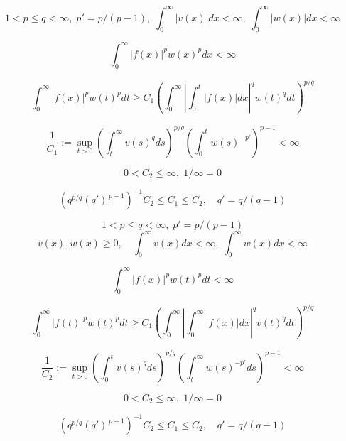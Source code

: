 $$
1<p\le q<\infty,\;p'=p/(p-1),\;\int^\infty_0|v(x)|dx<\infty,\;\int^\infty_0|w(x)|dx<\infty
$$

$$
\int^\infty_0|f(x)|^pw(x)^p dx<\infty
$$

$$
\int^\infty_0|f(x)|^p w(t)^p dt \ge C_1\left(\int^\infty_0\left|\int^t_0|f(x)|dx\right|^q w(t)^q dt\right)^{p/q}
$$

$$
\frac{1}{C_1}:=\sup_{t>0}\left(\int^\infty_t v(s)^q ds\right)^{p/q}\left(\int^t_0 w(s)^{-p'}\right)^{p-1}<\infty
$$

$$
0<C_2\le \infty,\; 1/\infty=0
$$

$$
\left(q^{p/q}(q')^{\,p-1}\right)^{-1}C_2 \le C_1 \le C_2,\quad q'=q/(q-1)
$$

$$
1<p \le q <\infty, \; p'=p/(p-1)
$$
$$
v(x),w(x) \ge 0, \quad \int^\infty_0 v(x) dx <\infty,\;\int^\infty_0 w(x) dx <\infty
$$

$$
\int^{\infty}_{0}|f(x)|^{p}w(t)^{p}dt<\infty
$$

$$
\int^{\infty}_{0}|f(t)|^{p}w(t)^{p}dt \ge C_{1}\left(\int^{\infty}_{0}\left|\int^{\infty}_{0}|f(x)|dx\right|^{q}v(t)^{q}dt\right)^{{p/q}}
$$

$$
\frac{1}{C_{2}}:=\sup_{t>0}\left(\int^{t}_{0}v(s)^{q}ds\right)^{p/q}\left(\int^{\infty}_{t}w(s)^{-p'}ds\right)^{p-1} < \infty
$$

$$
0<C_{2}\le\infty,\;1/\infty=0
$$

$$
\left(q^{p/q}(q')^{\,p-1}\right)^{-1}C_2 \le C_1 \le C_2,\quad q'=q/(q-1)
$$
